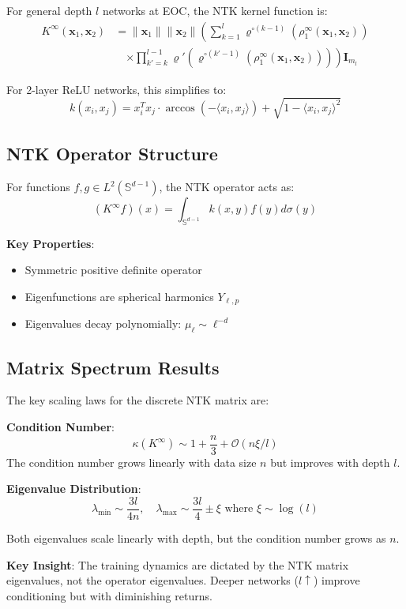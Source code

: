 \documentclass{article}
\begin{document}
For general depth $l$ networks at EOC, the NTK kernel function is:
\begin{align}
K^{\infty}(\mathbf{x}_1, \mathbf{x}_2) &= \|\mathbf{x}_1\| \|\mathbf{x}_2\| \left( \sum_{k=1}^l \varrho^{\circ (k-1)}\left(\rho_1^{\infty}(\mathbf{x}_1, \mathbf{x}_2)\right) \right. \\
&\quad \left. \times \prod_{k'=k}^{l-1} \varrho'\left(\varrho^{\circ (k'-1)}\left(\rho_1^{\infty}(\mathbf{x}_1, \mathbf{x}_2)\right)\right) \right) \mathbf{I}_{m_l}
\end{align}

For 2-layer ReLU networks, this simplifies to:
\[
k(x_i,x_j) = x_i^T x_j \cdot \arccos(-\langle x_i,x_j \rangle) + \sqrt{1-\langle x_i,x_j \rangle^2}
\]

\subsection{NTK Operator Structure}

For functions $f,g \in L^2(\mathbb{S}^{d-1})$, the NTK operator acts as:
\[
(K^{\infty} f)(x) = \int_{\mathbb{S}^{d-1}} k(x,y)f(y)d\sigma(y)
\]

\textbf{Key Properties}:
\begin{itemize}
\item Symmetric positive definite operator
\item Eigenfunctions are spherical harmonics $Y_{\ell,p}$
\item Eigenvalues decay polynomially: $\mu_\ell \sim \ell^{-d}$
\end{itemize}

\subsection{Matrix Spectrum Results}

The key scaling laws for the discrete NTK matrix are:

\textbf{Condition Number}:
\[ \kappa(K^{\infty}) \sim 1 + \frac{n}{3} + \mathcal{O}(n \xi / l) \]
The condition number grows linearly with data size $n$ but improves with depth $l$.

\textbf{Eigenvalue Distribution}:
\[ \lambda_{\text{min}} \sim \frac{3l}{4n}, \quad \lambda_{\text{max}} \sim \frac{3l}{4} \pm \xi \text{ where } \xi \sim \log(l) \]

Both eigenvalues scale linearly with depth, but the condition number grows as $n$.

\textbf{Key Insight}: The training dynamics are dictated by the NTK matrix eigenvalues, not the operator eigenvalues. Deeper networks ($l \uparrow$) improve conditioning but with diminishing returns.
\end{document}
